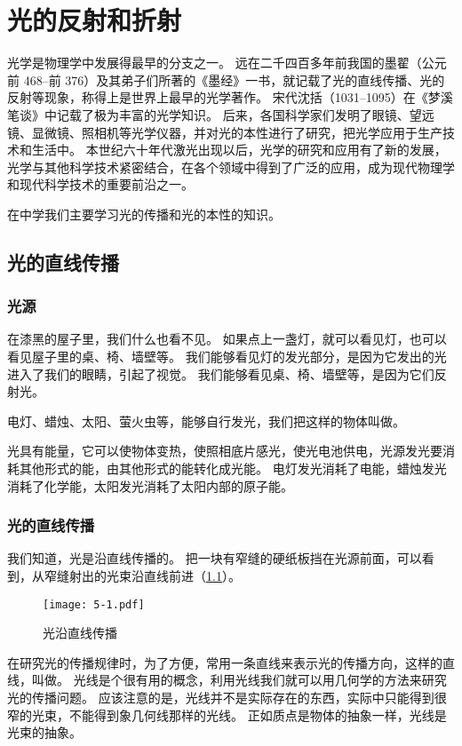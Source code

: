 \chapter{光的反射和折射}
光学是物理学中发展得最早的分支之一。
远在二千四百多年前我国的墨翟（公元前 468--前 376）及其弟子们所著的《墨经》一书，就记载了光的直线传播、光的反射等现象，称得上是世界上最早的光学著作。
宋代沈括（1031--1095）在《梦溪笔谈》中记载了极为丰富的光学知识。
后来，各国科学家们发明了眼镜、望远镜、显微镜、照相机等光学仪器，并对光的本性进行了研究，把光学应用于生产技术和生活中。
本世纪六十年代激光出现以后，光学的研究和应用有了新的发展，光学与其他科学技术紧密结合，在各个领域中得到了广泛的应用，成为现代物理学和现代科学技术的重要前沿之一。

在中学我们主要学习光的传播和光的本性的知识。

\section{光的直线传播}
\subsection{光源}
在漆黑的屋子里，我们什么也看不见。
如果点上一盏灯，就可以看见灯，也可以看见屋子里的桌、椅、墙壁等。
我们能够看见灯的发光部分，是因为它发出的光进入了我们的眼睛，引起了视觉。
我们能够看见桌、椅、墙壁等，是因为它们反射光。

电灯、蜡烛、太阳、萤火虫等，能够自行发光，我们把这样的物体叫做。

光具有能量，它可以使物体变热，使照相底片感光，使光电池供电，光源发光要消耗其他形式的能，由其他形式的能转化成光能。
电灯发光消耗了电能，蜡烛发光消耗了化学能，太阳发光消耗了太阳内部的原子能。

\subsection{光的直线传播}

我们知道，光是沿直线传播的。
把一块有窄缝的硬纸板挡在光源前面，可以看到，从窄缝射出的光束沿直线前进（\cref{fig:5-1}）。
\begin{figure}
  \texttt{[image: 5-1.pdf]}
  \caption{光沿直线传播}\label{fig:5-1}
\end{figure}

在研究光的传播规律时，为了方便，常用一条直线来表示光的传播方向，这样的直线，叫做。
光线是个很有用的概念，利用光线我们就可以用几何学的方法来研究光的传播问题。
应该注意的是，光线并不是实际存在的东西，实际中只能得到很窄的光束，不能得到象几何线那样的光线。
正如质点是物体的抽象一样，光线是光束的抽象。

